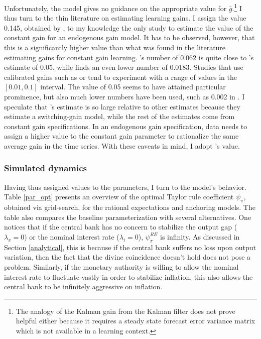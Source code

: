 \documentclass[11pt]{article}
\renewcommand{\[}{\begin{equation}}
\renewcommand{\]}{\end{equation}}
\begin{document}
Unfortunately, the model gives no guidance on the appropriate value for $\bar{g}$.\footnote{The analogy of the Kalman gain from the Kalman filter does not prove helpful either because it requires a steady state forecast error variance matrix which is not available in a learning context.} I thus turn to the thin literature on estimating learning gains. I assign the value  0.145, obtained by \cite{carvalho2019anchored}, to my knowledge the only study to estimate the value of the constant gain for an endogenous gain model. It has to be observed, however, that this is a significantly higher value than what was found in the literature estimating gains for constant gain learning. \cite{branch2006simple}'s number of 0.062 is quite close to \cite{eusepi2018limits}'s estimate of 0.05, while \cite{milani2007expectations} finds an even lower number of 0.0183. Studies that use calibrated gains such as \cite{williams2003adaptive} or \cite{orphanides2005decline} tend to experiment with a range of values in the $[0.01,0.1]$ interval. The value of 0.05 seems to have attained particular prominence, but also much lower numbers have been used, such as 0.002 in \cite{eusepi2011expectations}. I speculate that \cite{carvalho2019anchored}'s estimate is so large relative to other estimates because they estimate a switching-gain model, while the rest of the estimates come from constant gain specifications. In an endogenous gain specification, data needs to assign a higher value to the constant gain parameter to rationalize the same average gain in the time series. With these caveats in mind, I adopt \cite{carvalho2019anchored}'s value.

\subsubsection{Simulated dynamics}

Having thus assigned values to the parameters, I turn to the model's behavior. Table \ref{par_opt} presents an overview of the optimal Taylor rule coefficient $\psi_{\pi}$, obtained via grid-search, for the rational expectations and anchoring models. The table also compares the baseline parameterization with several alternatives. One notices that if the central bank has no concern to stabilize the output gap ($\lambda_x = 0$) or the nominal interest rate ($\lambda_i =0$), $\psi_{\pi}^{RE}$ is infinity. As discussed in Section \ref{analytical}, this is because if the central bank suffers no loss upon output variation, then the fact that the divine coincidence doesn't hold does not pose a problem. Similarly, if the monetary authority is willing to allow the nominal interest rate to fluctuate vastly in order to stabilize inflation, this also allows the central bank to be infinitely aggressive on inflation. 
\end{document}
